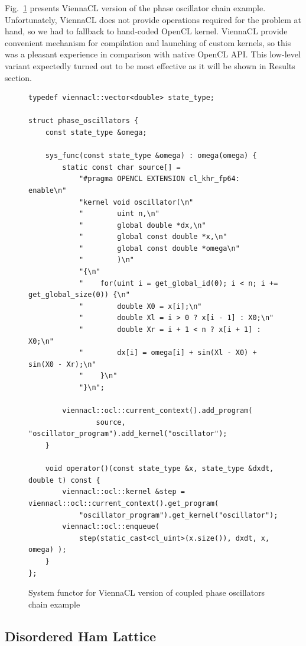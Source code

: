 \documentclass[1p]{elsarticle}
\newcommand{\figref}[1]{Fig.~\ref{#1}}
\begin{document}
\figref{code:viennacl:phase} presents ViennaCL version of the phase oscillator
chain example. Unfortunately, ViennaCL does not provide operations required for
the problem at hand, so we had to fallback to hand-coded OpenCL kernel.
ViennaCL provide convenient mechanism for compilation and launching of custom
kernels, so this was a pleasant experience in comparison with native OpenCL
API. This low-level variant expectedly turned out to be most effective as it
will be shown in Results section.

\begin{figure}[p]
\begin{lstlisting}
typedef viennacl::vector<double> state_type;

struct phase_oscillators {
    const state_type &omega;

    sys_func(const state_type &omega) : omega(omega) {
        static const char source[] =
            "#pragma OPENCL EXTENSION cl_khr_fp64: enable\n"
            "kernel void oscillator(\n"
            "        uint n,\n"
            "        global double *dx,\n"
            "        global const double *x,\n"
            "        global const double *omega\n"
            "        )\n"
            "{\n"
            "    for(uint i = get_global_id(0); i < n; i += get_global_size(0)) {\n"
            "        double X0 = x[i];\n"
            "        double Xl = i > 0 ? x[i - 1] : X0;\n"
            "        double Xr = i + 1 < n ? x[i + 1] : X0;\n"
            "        dx[i] = omega[i] + sin(Xl - X0) + sin(X0 - Xr);\n"
            "    }\n"
            "}\n";

        viennacl::ocl::current_context().add_program(
                source, "oscillator_program").add_kernel("oscillator");
    }

    void operator()(const state_type &x, state_type &dxdt, double t) const {
        viennacl::ocl::kernel &step = viennacl::ocl::current_context().get_program(
            "oscillator_program").get_kernel("oscillator");
        viennacl::ocl::enqueue(
            step(static_cast<cl_uint>(x.size()), dxdt, x, omega) );
    }
};
\end{lstlisting}
\caption{System functor for ViennaCL version of coupled phase oscillators chain
example}
\label{code:viennacl:phase}
\end{figure}

\subsection{Disordered Ham Lattice}
\end{document}

